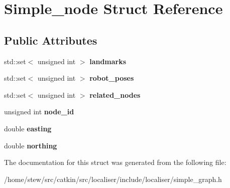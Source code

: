 \hypertarget{structSimple__node}{}\section{Simple\+\_\+node Struct Reference}
\label{structSimple__node}
\subsection*{Public Attributes}
\begin{DoxyCompactItemize}
\item 
\mbox{\label{structSimple__node_a4b40187a12d5b9515e7ea46ab67f1386}} 
std\+::set$<$ unsigned int $>$ {\bfseries landmarks}
\item 
\mbox{\label{structSimple__node_aeab16f54e4528a0e655f315b0708d2d7}} 
std\+::set$<$ unsigned int $>$ {\bfseries robot\+\_\+poses}
\item 
\mbox{\label{structSimple__node_aca30ab6a39afa18d2d972c266024eed2}} 
std\+::set$<$ unsigned int $>$ {\bfseries related\+\_\+nodes}
\item 
\mbox{\label{structSimple__node_a1a7a9ba0d40c19fddc20022951b17b84}} 
unsigned int {\bfseries node\+\_\+id}
\item 
\mbox{\label{structSimple__node_a447fecb43f262fdb5a7656e7fea91c30}} 
double {\bfseries easting}
\item 
\mbox{\label{structSimple__node_a9a40a987d23afc35df7285ed59baca13}} 
double {\bfseries northing}
\end{DoxyCompactItemize}


The documentation for this struct was generated from the following file\+:\begin{DoxyCompactItemize}
\item 
/home/stew/src/catkin/src/localiser/include/localiser/simple\+\_\+graph.\+h\end{DoxyCompactItemize}
